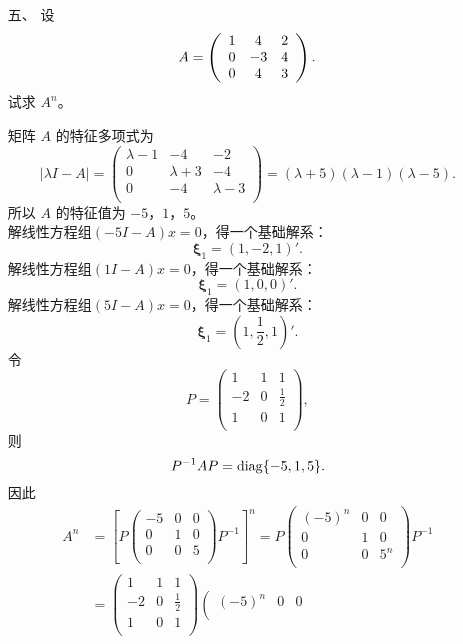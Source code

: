 \begin{enumerate}[1~]
\item[五、]
设\[
A = \left( \begin{array} { c c c } { 1 } & { 4 } & { 2 } \\ { 0 } & { - 3 } & { 4 } \\ { 0 } & { 4 } & { 3 } \end{array} \right).
\]
试求 $A^n$。
\begin{solution}
矩阵 $A$ 的特征多项式为\[
|\lambda I-A|=\left(
\begin{array}{ccc}
 \lambda-1 & -4 & -2 \\
 0 & \lambda+3 & -4 \\
 0 & -4 & \lambda-3 \\
\end{array}
\right) = (\lambda+5) (\lambda-1) (\lambda-5).
\]
所以 $A$ 的特征值为 $-5$，$1$，$5$。\\
解线性方程组$(-5I-A)x=0$，得一个基础解系：\[
\boldsymbol{\xi}_1=(1, -2, 1)'.
\]
解线性方程组$(1I-A)x=0$，得一个基础解系：\[
\boldsymbol{\xi}_1=(1, 0, 0)'.
\]
解线性方程组$(5I-A)x=0$，得一个基础解系：\[
\boldsymbol{\xi}_1=\left(1, \frac12, 1\right)'.
\]
令\[
P=\left( \begin{matrix}
	1&		1&		1\\
	-2&		0&		\frac{1}{2}\\
	1&		0&		1\\
\end{matrix} \right) ,
\]
则\[
P^{-1}AP={\rm diag}\{-5, 1, 5\}.
\]
因此\begin{align*}
A^n&=\left[ P\left( \begin{matrix}
	-5&		0&		0\\
	0&		1&		0\\
	0&		0&		5\\
\end{matrix} \right) P^{-1}\right]^n=P\left( \begin{matrix}
	(-5)^n&		0&		0\\
	0&		1&		0\\
	0&		0&		5^n\\
\end{matrix} \right) P^{-1}\\
&=\left( \begin{matrix}
	1&		1&		1\\
	-2&		0&		\frac{1}{2}\\
	1&		0&		1\\
\end{matrix} \right)
\left( \begin{matrix}
	(-5)^n&		0&		0\\

\end{matrix}
\end{align*}
\end{solution}
\end{enumerate}
